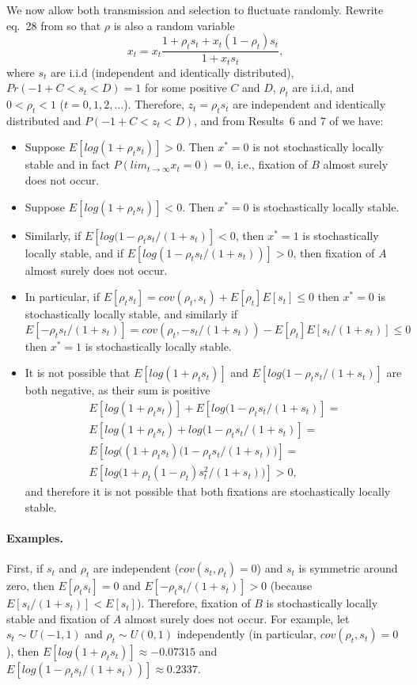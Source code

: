 \documentclass[12pt]{extarticle} %
\begin{document}
We now allow both transmission and selection to fluctuate randomly.
Rewrite eq.~28 from \citet{Ram2018} so that $\rho$ is also a random variable
\begin{equation}
x_t = x_t \frac{1 + \rho_t s_t + x_t (1 - \rho_t) s_t}{1 + x_t s_t},
\end{equation}
where $s_t$ are i.i.d (independent and identically distributed), $Pr(-1+C<s_t<D)=1$ for some positive $C$ and $D$, $\rho_t$ are i.i.d, and  $0<\rho_t<1$ ($t=0,1,2,\ldots$).
Therefore, $z_t = \rho_t s_t$  are independent and identically distributed and $P(-1+C < z_t < D)$, and from Results~6 and 7 of \citet{Ram2018} we have:
\begin{itemize}
\item Suppose $E[log(1+\rho_t s_t)]>0$. Then $x^*=0$ is not stochastically locally stable and in fact $P(lim_{t \to \infty} x_t=0) = 0$, i.e., fixation of $B$ almost surely does not occur.
\item Suppose $E[log(1+\rho_t s_t)]<0$. Then $x^*=0$ is stochastically locally stable. 
\item Similarly, if $E[log(1-\rho_t s_t/(1+s_t)]<0$, then $x^*=1$ is stochastically locally stable, and if $E[log(1-\rho_t s_t/(1+s_t))]>0$, then fixation of $A$ almost surely does not occur.
\item In particular, if $E[\rho_t s_t] = cov(\rho_t, s_t) + E[\rho_t] E[s_t] \le 0$ then $x^*=0$ is stochastically locally stable, and similarly if $E[-\rho_t s_t/(1+s_t)] = cov(\rho_t, -s_t/(1+s_t)) - E[\rho_t] E[s_t/(1+s_t)] \le 0$ then $x^*=1$ is stochastically locally stable.
\item It is not possible that $E[log(1+\rho_t s_t)]$ and $E[log(1-\rho_t s_t/(1+s_t)]$ are both negative, as their sum is positive
\begin{multline}
E[log(1+\rho_t s_t)] + E[log(1-\rho_t s_t/(1+s_t)] = \\
E[log(1+\rho_t s_t) + log(1-\rho_t s_t/(1+s_t)]= \\
E[log\big((1+\rho_t s_t)(1-\rho_t s_t/(1+s_t)\big)]= \\
E[log\big( 1+\rho_t(1-\rho_t)s_t^2/(1+s_t) \big)] > 0,
\end{multline}
and therefore it is not possible that both fixations are stochastically locally stable.
\end{itemize}

\paragraph{Examples.}
First, if $s_t$ and $\rho_t$ are independent ($cov(s_t, \rho_t)=0$) and $s_t$ is symmetric around zero, then $E[\rho_t s_t]=0$ and $E[-\rho_t s_t/(1+s_t)]>0$ (because $E[s_t/(1+s_t)] < E[s_t]$).
Therefore, fixation of $B$ is stochastically locally stable and fixation of $A$ almost surely does not occur.
For example, let $s_t \sim U(-1, 1)$ and $\rho_t \sim U(0,1)$ independently (in particular, $cov(\rho_t, s_t)=0$), then $E[log(1+\rho_t s_t)]\approx -0.07315$ and $E[log(1-\rho_t s_t/(1+s_t))]\approx 0.2337$.
\end{document}
